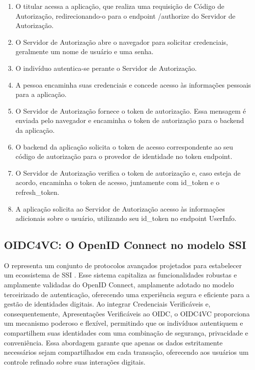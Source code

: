 \begin{enumerate}
    \item O titular acessa a aplicação, que realiza uma requisição de Código de Autorização, redirecionando-o para o endpoint /authorize do Servidor de Autorização.
    
    \item O Servidor de Autorização abre o navegador para solicitar credenciais, geralmente um nome de usuário e uma senha.
    
    \item O indivíduo autentica-se perante o Servidor de Autorização.
    
    \item A pessoa encaminha suas credenciais e concede acesso às informações pessoais para a aplicação.
    
    \item O Servidor de Autorização fornece o token de autorização. Essa mensagem é enviada pelo navegador e encaminha o token de autorização para o backend da aplicação.
    
    \item O backend da aplicação solicita o token de acesso correspondente ao seu código de autorização para o provedor de identidade no token endpoint.
    
    \item O Servidor de Autorização verifica o token de autorização e, caso esteja de acordo, encaminha o token de acesso, juntamente com id\_token e o refresh\_token.
    
    \item A aplicação solicita ao Servidor de Autorização acesso às informações adicionais sobre o usuário, utilizando seu id\_token no endpoint UserInfo.
\end{enumerate}


\subsection{OIDC4VC: O OpenID Connect no modelo SSI }\label{subsec:oidc4vc}

O  representa um conjunto de protocolos avançados projetados para estabelecer um ecossistema de \acs{SSI} \cite{OIDC4VCWhitepaper2022}. Esse sistema capitaliza as funcionalidades robustas e amplamente validadas do OpenID Connect, amplamente adotado no modelo terceirizado de autenticação, oferecendo uma experiência segura e eficiente para a gestão de identidades digitais. Ao integrar Credenciais Verificáveis e, consequentemente, Apresentações Verificáveis ao \acs{OIDC}, o \acs{OIDC4VC} proporciona um mecanismo poderoso e flexível, permitindo que os indivíduos autentiquem e compartilhem suas identidades com uma combinação de segurança, privacidade e conveniência.  Essa abordagem garante que apenas os dados estritamente necessários sejam compartilhados em cada transação, oferecendo aos usuários um controle refinado sobre suas interações digitais.

